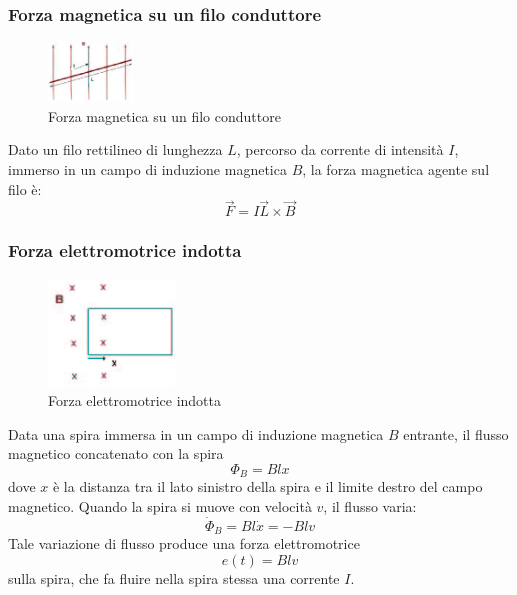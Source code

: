 \documentclass[a4paper]{report}
\begin{document}
\subsubsection{Forza magnetica su un filo conduttore}
\begin{figure}[!h]
\centering
\includegraphics[width=0.2\textwidth]{./images/forza-magnetica02.png}
\caption{Forza magnetica su un filo conduttore\label{fig:forza-magnetica02}}
\end{figure}
Dato un filo rettilineo di lunghezza $L$, percorso da corrente di
intensit\`a $I$, immerso in un campo di induzione magnetica $B$, la
forza magnetica agente sul filo \`e:
\begin{equation}\label{eq:forza-magnetica-filo}
  \vec{F} = I \vec{L} \times \vec{B}
\end{equation}

\subsubsection{Forza elettromotrice indotta}
\begin{figure}[!h]
\centering
\includegraphics[width=0.3\textwidth]{./images/forza-magnetica03.png}
\caption{Forza elettromotrice indotta\label{fig:forza-magnetica03}}
\end{figure}
Data una spira immersa in un campo di induzione magnetica $B$
entrante, il flusso magnetico concatenato con la spira
\[
  \Phi_B = B l x
\]
dove $x$ \`e la distanza tra il lato sinistro della spira e il limite
destro del campo magnetico. Quando la spira si muove con velocit\`a
$v$, il flusso varia:
\[
  \dot{\Phi}_B = B l \dot{x} = - B l v
\]
Tale variazione di flusso produce una forza elettromotrice 
\[
  e(t) = B l v
\]
sulla spira, che  fa fluire nella spira stessa una corrente $I$.
\end{document}
